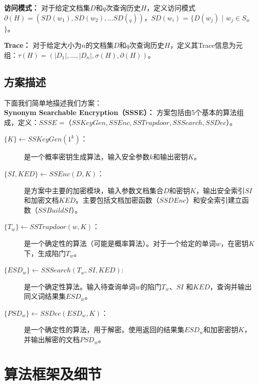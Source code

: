 \textbf{访问模式：} 对于给定文档集$D$和$q$次查询历史$H$，定义访问模式 $\partial(H) = (SD(w_1), SD(w_2), ... SD(_q))$，$SD(w_i)$ = $\{D(w_j)$ | $w_j \in S_w$ $\}$。

\textbf{Trace：} 对于给定大小为$n$的文档集$D$和$q$次查询历史$H$，定义其Trace信息为元组：$\tau(H) = (|D_1|, ..., |D_n|, \sigma(H), \partial(H))$。


\subsection{方案描述}
\label{sec:synonym_model_scheme_description}

下面我们简单地描述我们方案：\\
%
%
\textbf{Synonym Searchable Encryption（SSSE）：} 方案包括由5个基本的算法组成，定义：$SSSE$ =（$SSKeyGen, SSEnc, SSTrapdoor, SSSearch, SSDec$）。
\begin{description}
  \item[$\{K\} \leftarrow SSKeyGen(1^k)$：]是一个概率密钥生成算法，输入安全参数$k$和输出密钥$K$。
  \item[$\{SI, KED\} \leftarrow SSEnc(D, K)$：]是方案中主要的加密模块，输入参数文档集合$D$和密钥$K$，输出安全索引$SI$和加密文档$KED$。主要包括文档加密函数（$SSDEnc$）和安全索引建立函数（$SSBuildSI$）。
  \item[$\{T_w\} \leftarrow SSTrapdoor(w, K)$：]是一个确定性的算法（可能是概率算法）。对于一个给定的单词$w$，在密钥$K$下，生成陷门${T_w}$。
  \item[$\{ESD_w\} \leftarrow SSSearch(T_w, SI, KED)$:]是一个确定性算法。输入待查询单词$w$的陷门$T_w$、$SI$ 和$KED$，查询并输出同义词结果集${ESD_w}$。
  \item[$\{PSD_w\} \leftarrow SSDec(ESD_w, K)$：]是一个确定性的算法，用于解密。使用返回的结果集${ESD_w}$和加密密钥$K$，并输出解密的文档${PSD_w}$。
\end{description}


\section{算法框架及细节}
\label{sec:synonym_scheme}

